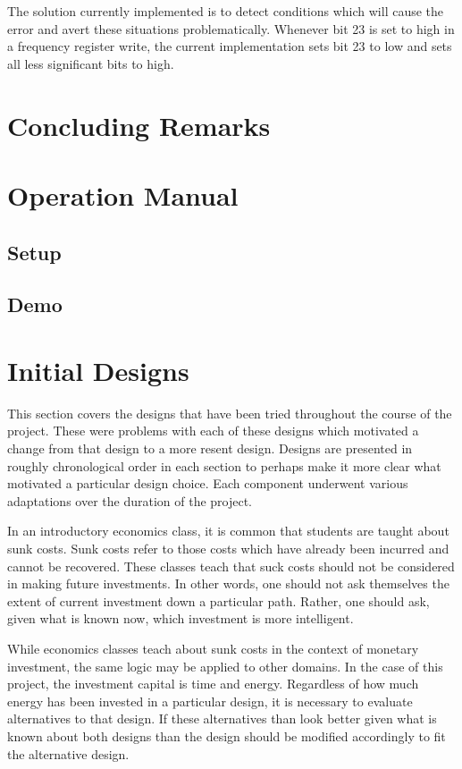 \documentclass{article}	%
\begin{document}
\begin{multicols}{2}
The solution currently implemented is
to detect conditions which will cause the error
and avert these situations problematically.
Whenever bit 23 is set to high in a frequency register write,
the current implementation sets bit 23 to low
and sets all less significant bits to high.

\section{Concluding Remarks}

\end{multicols}

\pagebreak
\appendix

\section{Operation Manual}

\subsection{Setup}

\subsection{Demo}

\newpage
\section{Initial Designs}
This section covers the designs that have been tried
throughout the course of the project. 
These were problems with each of these designs
which motivated a change from that design to
a more resent design.
Designs are presented in roughly chronological order in each section
to perhaps make it more clear what motivated
a particular design choice.
Each component underwent various adaptations 
over the duration of the project.

In an introductory economics class,
it is common that students are taught about sunk costs.
Sunk costs refer to those costs which
have already been incurred and
cannot be recovered.
These classes teach that suck costs should not
be considered in making future investments.
In other words,
one should not ask themselves the extent of 
current investment down a particular path.
Rather, one should ask,
given what is known now,
which investment is more intelligent.

While economics classes teach about sunk costs in
the context of monetary investment,
the same logic may be applied to other domains.
In the case of this project,
the investment capital is time and energy.
Regardless of how much energy has been invested
in a particular design,
it is necessary to evaluate alternatives to that design.
If these alternatives than look better
given what is known about both designs
than the design should be modified accordingly
to fit the alternative design.
\end{document}
